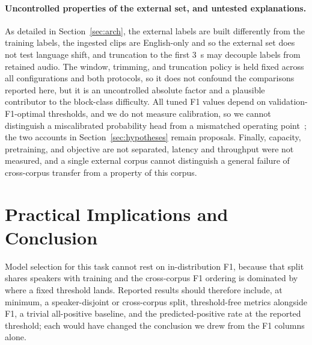 \documentclass[a4paper,orivec]{llncs}
\begin{document}
\paragraph{Uncontrolled properties of the external set, and untested
explanations.} As detailed in Section~\ref{sec:arch}, the external labels are
built differently from the training labels, the ingested clips are English-only
and so the external set does not test language shift, and truncation to the
first 3~s may decouple labels from retained
audio. The window, trimming, and truncation policy is held fixed across all
configurations and both protocols, so it does not confound the comparisons
reported here, but it is an uncontrolled absolute factor and a plausible
contributor to the block-class difficulty. All tuned F1 values depend on
validation-F1-optimal thresholds, and we do not measure calibration, so we cannot
distinguish a miscalibrated probability head from a mismatched operating
point~\cite{guo2017calibration}; the two accounts in Section~\ref{sec:hypotheses}
remain proposals. Finally, capacity, pretraining, and objective are not separated,
latency and throughput were not measured, and a single external corpus cannot
distinguish a general failure of cross-corpus transfer from a property of this
corpus.

\section{Practical Implications and Conclusion}
\label{sec:conclusion}
Model selection for this task cannot rest on in-distribution F1, because that
split shares speakers with training and the cross-corpus F1 ordering is dominated
by where a fixed threshold lands. Reported results should therefore include, at
minimum, a speaker-disjoint or cross-corpus split, threshold-free metrics
alongside F1, a trivial all-positive baseline, and the predicted-positive rate at
the reported threshold; each would have changed the conclusion we drew from the F1
columns alone.
\end{document}
